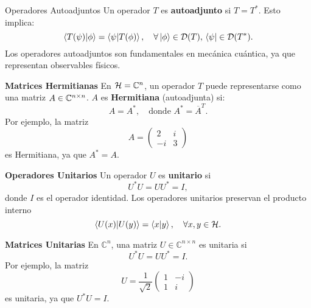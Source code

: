 \documentclass[main.tex]{subfiles}
\begin{document}
\begin{def.}{Operadores Autoadjuntos}
Un operador $T$ es \textbf{autoadjunto} si $T = T^*$. Esto implica:
\[
  \braket{T(\psi)|\phi}=\braket{\psi| T(\phi)}, \quad \forall \ket{\phi} \in \mathcal{D}(T), \, \bra{\psi} \in \mathcal{D}(T^*).
\]
Los operadores autoadjuntos son fundamentales en mecánica cuántica, ya que representan observables físicos.
\end{def.}
\eje\textbf{Matrices Hermitianas}
En $\mathcal{H} = \mathbb{C}^n$, un operador $T$ puede representarse como una matriz $A\in\mathbb C ^{n \times n}$. $A$ es \textbf{Hermitiana} (autoadjunta) si:
\[
A = A^*, \quad \text{donde } A^* = \overline{A}^T.
\]
Por ejemplo, la matriz
\[
A = \begin{pmatrix}
2 & i \\
-i & 3
\end{pmatrix}
\]
es Hermitiana, ya que $A^* = A$.

\eje\textbf{Operadores Unitarios}
Un operador $U$ es \textbf{unitario} si
\[
U^* U = U U^* = I,
\]
donde $I$ es el operador identidad. Los operadores unitarios preservan el producto interno
\[
\braket{ U(x)| U(y)} = \braket{ x | y}, \quad \forall x, y \in \mathcal{H}.
\]

\eje\textbf{Matrices Unitarias}
En $\mathbb{C}^n$, una matriz $U \in \mathbb{C}^{n \times n}$ es unitaria si
\[
U^* U = U U^* = I.
\]
Por ejemplo, la matriz
\[
U = \frac{1}{\sqrt{2}} \begin{pmatrix}
1 & -i \\
1 & i
\end{pmatrix}
\]
es unitaria, ya que $U^* U = I$.
\end{document}
